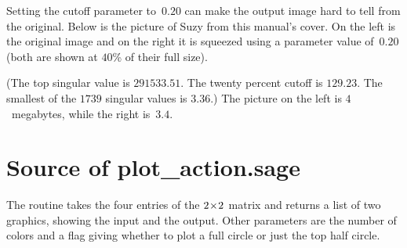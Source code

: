 Setting
the cutoff parameter to~$0.20$ can make the output image hard to tell
from the original.
Below is the picture of Suzy 
from this manual's cover.
On the left is the original image
and on the right it is squeezed using a parameter value of~$0.20$
(both are shown at $40$\% of their full size).
\begin{center}
  \quad
\end{center}
(The top singular value is 
$291533.51$.
The twenty percent cutoff is $129.23$. 
The smallest of the $1739$ singular values is $3.36$.)
The picture on the left is $4$~megabytes, 
while the right is~$3.4$.


\section{Source of plot\_action.sage}

The 
routine takes the four entries of the $2 \! \times \! 2$
matrix and returns a list of two graphics, showing the input and the
output.
Other parameters are the number of colors and a flag giving whether
to plot a full circle or just the top half circle.

